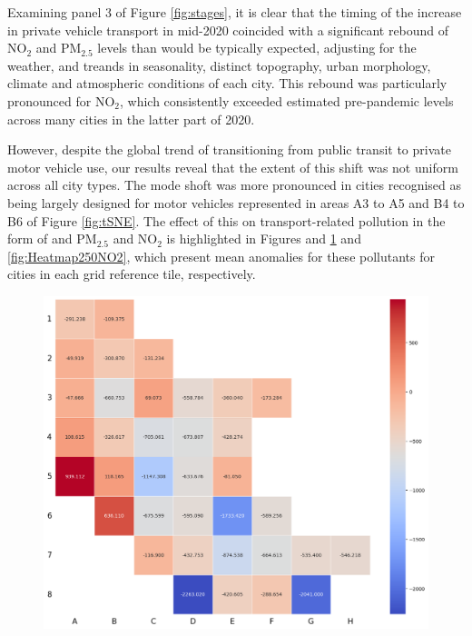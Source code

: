 \documentclass[preprint,12pt]{elsarticle}
\begin{document}
Examining panel 3 of Figure \ref{fig:stages}, it is clear that the timing of the increase in private vehicle transport in mid-2020 coincided with a significant rebound of NO$_{2}$ and PM$_{2.5}$ levels than would be typically expected, adjusting for the weather, and treands in seasonality, distinct topography, urban morphology, climate and atmospheric conditions of each city\cite{Wijnands2022}. This rebound was particularly pronounced for NO$_{2}$, which consistently exceeded estimated pre-pandemic levels across many cities in the latter part of 2020.

However, despite the global trend of transitioning from public transit to private motor vehicle use\cite{fernando2023shaping}, our results reveal that the extent of this shift was not uniform across all city types. The mode shoft  was more pronounced in cities recognised as being largely designed for motor vehicles\cite{Thompson2020} represented in areas A3 to A5 and B4 to B6 of Figure \ref{fig:tSNE}. The effect of this on transport-related pollution in the form of and PM$_{2.5}$ and NO$_{2}$ is highlighted in Figures  and \ref{fig:Heatmap250PM} and \ref{fig:Heatmap250NO2}, which present mean anomalies for these pollutants for cities in each grid reference tile, respectively.

\begin{figure}
\centering
\includegraphics[trim={0 0 0 0},clip,scale=0.45]{Images/heatmap_pm25Anomaly250.png}
\caption{\bf }  
 \label{fig:Heatmap250PM}
\end{figure}
\end{document}
